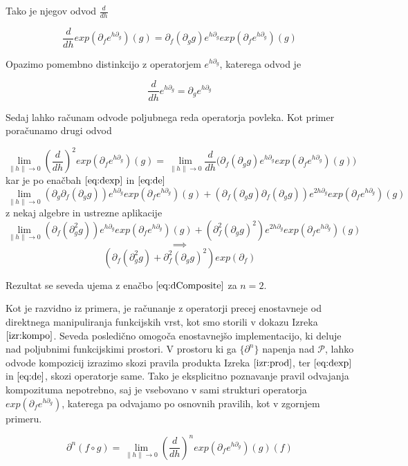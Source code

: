 \documentclass{article}
\newcommand{\dP}{\mathcal{P}}
\newcommand{\D}{\partial}
\begin{document}
 Tako je njegov odvod $\frac{d}{dh}$
 
 \begin{equation}\label{eq:dexp}
 \frac{d}{dh}exp(\D_fe^{h\D_g})(g)=\D_f(\D_gg)e^{h\D_g}exp(\D_fe^{h\D_g})(g)
 \end{equation}
 
 Opazimo pomembno distinkcijo z operatorjem $e^{h\D_g}$, katerega odvod je
 
 \begin{equation}\label{eq:de}
\frac{d}{dh}e^{h\D_g}=\D_ge^{h\D_g}
 \end{equation}
 
 Sedaj lahko računam odvode poljubnega reda operatorja povleka. Kot primer poračunamo drugi odvod
 
 $$\lim\limits_{\lVert h\rVert\to 0}(\frac{d}{dh})^2exp(\D_fe^{h\D_g})(g)=\lim\limits_{\lVert h\rVert\to 0}\frac{d}{dh}\Big(\D_f(\D_gg)e^{h\D_g}exp(\D_fe^{h\D_g})(g)\Big)$$
 kar je po enačbah $\eqref{eq:dexp}$ in $\eqref{eq:de}$
 $$\lim\limits_{\lVert h\rVert\to 0}(\D_g\D_f(\D_gg))e^{h\D_g}exp(\D_fe^{h\D_g})(g)+(\D_f(\D_gg)\D_f(\D_gg))e^{2h\D_g}exp(\D_fe^{h\D_g})(g)$$
 z nekaj algebre in ustrezne aplikacije
 $$\lim\limits_{\lVert h\rVert\to 0}(\D_f(\D^2_gg))e^{h\D_g}exp(\D_fe^{h\D_g})(g)+(\D^2_f(\D_gg)^2)e^{2h\D_g}exp(\D_fe^{h\D_g})(g)$$
  $$\implies$$
 \begin{equation}
	(\D_f(\D^2_gg)+\D^2_f(\D_gg)^2)exp(\D_f)
 \end{equation}
 
 Rezultat se seveda ujema z enačbo $\eqref{eq:dComposite}$ za $n=2$.
 
 Kot je razvidno iz primera, je računanje z operatorji precej enostavneje od direktnega manipuliranja funkcijskih vrst, kot smo storili v dokazu Izreka $\ref{izr:kompo}$. Seveda posledično omogoča enostavnejšo implementacijo, ki deluje nad poljubnimi funkcijskimi prostori. V prostoru ki ga $\{\D^n\}$ napenja nad $\dP$, lahko odvode kompozicij izrazimo skozi pravila produkta Izreka $\ref{izr:prod}$, ter $\eqref{eq:dexp}$ in $\eqref{eq:de}$, skozi operatorje same. Tako je eksplicitno poznavanje pravil odvajanja kompozituma nepotrebno, saj je vsebovano v sami strukturi operatorja $exp(\D_fe^{h\D_g})$, katerega pa odvajamo po osnovnih pravilih, kot v zgornjem primeru.
 
 \begin{equation}
 \D^n(f\circ g)=\lim\limits_{\lVert h\rVert\to 0}(\frac{d}{dh})^nexp(\D_fe^{h\D_g})(g)(f)
 \end{equation}
 
\end{document}
